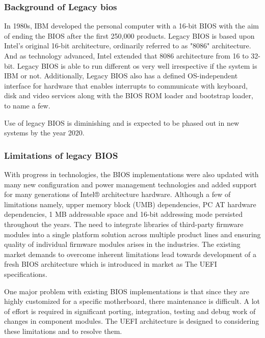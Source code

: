 \subsubsection{Background of Legacy \gls{bios}}
In 1980s, IBM developed the personal computer with a 16-bit BIOS with the aim of ending the BIOS after the first 250,000 products. Legacy BIOS is based upon Intel’s original 16-bit architecture, ordinarily referred to as "8086" architecture. And as technology advanced, Intel extended that 8086 architecture from 16 to 32-bit. Legacy BIOS is able to run different \gls{os} very well irrespective if the system is IBM or not. Additionally, Legacy BIOS also has a defined OS-independent interface for hardware that enables interrupts to communicate with keyboard, disk and video services along with the BIOS ROM loader and bootstrap loader, to name a few.

Use of legacy BIOS is diminishing and is expected to be phased out in new systems by the year 2020.

\subsubsection{Limitations of legacy BIOS}
With progress in technologies, the BIOS implementations were also updated with many new configuration and power management technologies and added support for many generations of Intel® architecture hardware. Although a few of limitations namely, upper memory block (UMB) dependencies, PC AT hardware dependencies, 1 MB addressable space and 16-bit addressing mode persisted throughout the years. The need to integrate libraries of third-party firmware modules into a single platform solution across multiple product lines and ensuring quality of individual firmware modules arises in the industries. The existing market demands to overcome inherent limitations lead towards development of a fresh BIOS architecture which is introduced in market as The UEFI specifications.

One major problem with existing BIOS implementations is that since they are highly customized for a specific motherboard, there maintenance is difficult. A lot of effort is required in significant porting, integration, testing and debug work of changes in component modules. The UEFI architecture is designed to considering these limitations and to resolve them.


